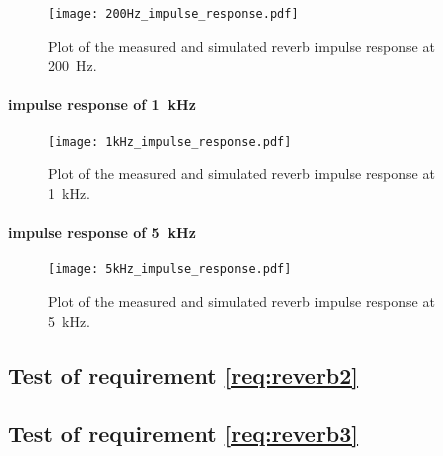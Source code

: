 \begin{figure}[!h]
    \centering
        \texttt{[image: 200Hz\_impulse\_response.pdf]}
        \caption{Plot of the measured and simulated \gls{reverb} impulse response at \SI{200}{\hertz}.}
        \label{fig:tests:reverb:200Hz}
  \end{figure}

\paragraph{impulse response of \SI{1}{\kilo\hertz}}

\begin{figure}[!h]
    \centering
        \texttt{[image: 1kHz\_impulse\_response.pdf]}
        \caption{Plot of the measured and simulated \gls{reverb} impulse response at \SI{1}{\kilo\hertz}.}
        \label{fig:tests:reverb:1kHz}
  \end{figure}
  
  
 \paragraph{impulse response of \SI{5}{\kilo\hertz}}

\begin{figure}[!h]
    \centering
        \texttt{[image: 5kHz\_impulse\_response.pdf]}
        \caption{Plot of the measured and simulated \gls{reverb} impulse response at \SI{5}{\kilo\hertz}.}
        \label{fig:tests:reverb:5kHz}
  \end{figure}
  
  
\subsection{Test of requirement \autoref{req:reverb2}}

\subsection{Test of requirement \autoref{req:reverb3}}

